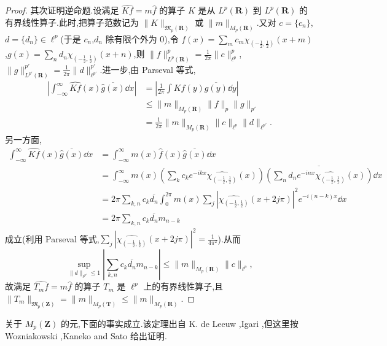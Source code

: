 \begin{proof}
其次证明逆命题.设满足 $\widehat{Kf} = m\widehat{f}$ 的算子 $K$ 是从 $L^{p}(\mathbf{R})$ 到 $L^{p}(\mathbf{R})$ 的有界线性算子.此时,把算子范数记为 $\|K\|_{\mathfrak{M}_{p}(\mathbf{R})}$ 或 $\|m\|_{M_{p}(\mathbf{R})}$.又对 $c = \{c_{n}\}$,$d = \{d_{n}\} \in \ell^{p}$(于是 $c_{n}$,$d_{n}$ 除有限个外为 0),令 $f(x) = \sum_{m}c_{m}\chi_{(-\frac{1}{2}, \frac{1}{2})}(x + m)$,$g(x) = \sum_{n}d_{n}\chi_{(-\frac{1}{2}, \frac{1}{2})}(x + n)$,则 $\|f\|_{L^{p}(\mathbf{R})}^{p} = \frac{1}{2\pi}\|c\|_{\ell^{p}}^{p}$,$\|g\|_{L^{p'}(\mathbf{R})}^{p'} = \frac{1}{2\pi}\|d\|_{\ell^{p'}}^{p'}$.进一步,由 Parseval 等式,
\begin{align*}
\left|\int_{-\infty}^{\infty}\widehat{Kf}(x)\overline{\widehat{g}(x)}\dd x\right| &= \left|\frac{1}{2\pi}\int Kf(y)\overline{g(y)}\dd y\right|\\
&\leq \|m\|_{M_{p}(\mathbf{R})}\|f\|_{p}\|g\|_{p'}\\
&= \frac{1}{2\pi}\|m\|_{M_{p}(\mathbf{R})}\|c\|_{\ell^{p}}\|d\|_{\ell^{p'}}.
\end{align*}
另一方面,
\begin{align*}
\int_{-\infty}^{\infty}\widehat{Kf}(x)\overline{\widehat{g}(x)}\dd x&= \int_{-\infty}^{\infty}m(x)\widehat{f}(x)\overline{\widehat{g}(x)}\dd x\\
&= \int_{-\infty}^{\infty}m(x)\left(\sum_{k}c_{k}e^{-ikx}\widehat{\chi_{(-\frac{1}{2}, \frac{1}{2})}}(x)\right)\overline{\left(\sum_{n}d_{n}e^{-inx}\widehat{\chi_{(-\frac{1}{2}, \frac{1}{2})}}(x)\right)}\dd x\\
&= 2\pi\sum_{k, n}c_{k}\overline{d_{n}}\int_{0}^{2\pi}m(x)\sum_{j}\left|\widehat{\chi_{(-\frac{1}{2}, \frac{1}{2})}}(x + 2j\pi)\right|^{2}e^{-i(n-k)x}\dd x\\
&= 2\pi\sum_{k, n}c_{k}\overline{d_{n}}m_{n - k}
\end{align*}
成立(利用 Parseval 等式,$\sum_{j}|\widehat{\chi_{(-\frac{1}{2}, \frac{1}{2})}}(x + 2j\pi)|^{2} = \frac{1}{4\pi^{2}}$).从而
\begin{equation*}
\sup_{\|d\|_{\ell^{p'}} \leq 1}\left|\sum_{k, n}c_{k}\overline{d_{n}}m_{n - k}\right| \leq \|m\|_{M_{p}(\mathbf{R})}\|c\|_{\ell^{p}},
\end{equation*}
故满足 $\widehat{T_{m}f} = m\widehat{f}$ 的算子 $T_{m}$ 是 $\ell^{p}$ 上的有界线性算子,且 $\|T_{m}\|_{\mathfrak{M}_{p}(\mathbf{Z})} = \|m\|_{M_{p}(\mathbf{T})} \leq \|m\|_{M_{p}(\mathbf{R})}$.
\end{proof}

关于 $M_{p}(\mathbf{Z})$ 的元,下面的事实成立.该定理出自 K. de Leeuw \cite{ch3:17},Igari \cite{ch3:25},但这里按 Wozniakowski \cite{ch3:56},Kaneko and Sato \cite{ch3:28} 给出证明.

